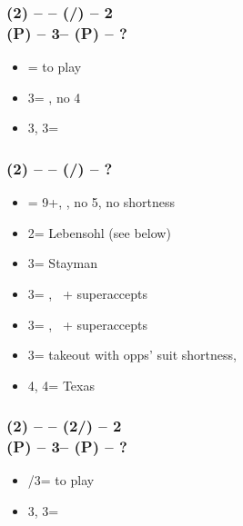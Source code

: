 \documentclass[12pt, a4paper]{report}
\begin{document}
{{        \subsubsection*{(2\diams) -- \dbl -- (\rdbl/\pass) -- 2\nt \\
                        (P) -- 3\clubs -- (P) -- ?}        
        \begin{itemize}
            \item \pass = to play
            \item 3\diams = \gf, no 4\major \vimp
            \item 3\hearts, 3\spades = \inv
        \end{itemize}

        \subsubsection*{(2\diams) -- \dbl -- (\hearts/\spades) -- ?}        
        \begin{itemize}
            \item \dbl = 9+, \fton{2\nt}, no 5\major, no \major shortness
            \item 2\nt = Lebensohl (see below)
            \item 3\clubs = Stayman \vimp
            \item 3\diams = \trsf{\hearts}, \gf\ + superaccepts
            \item 3\hearts = \trsf{\spades}, \gf\ + superaccepts
            \item 3\spades = takeout with opps' suit shortness, \gf
            \item 4\diams, 4\hearts = Texas
        \end{itemize}

        \subsubsection*{(2\diams) -- \dbl -- (2\hearts/\spades) -- 2\nt \\
                        (P) -- 3\clubs -- (P) -- ?}        
        \begin{itemize}
            \item \pass/3\diams = to play
            \item 3\hearts, 3\spades = \inv
        \end{itemize}

}}
\end{document}
